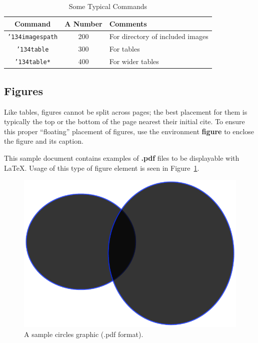 \documentclass[article]{stucosrec}
\begin{document}
	\begin{table}
		\centering
		\caption{Some Typical Commands}
		\label{tab:table2}
		\begin{tabular}{|c|c|l|} \hline
			Command&A Number&Comments\\ \hline
			\texttt{{\char'134}imagespath} & 200 & For directory of included images \\ \hline
			\texttt{{\char'134}table} & 300 & For tables\\ \hline
			\texttt{{\char'134}table*} & 400& For wider tables\\ \hline
		\end{tabular}
	\end{table}
	
	\subsection{Figures}
	
	Like tables, figures cannot be split across pages; the best placement for them is typically the top or the bottom of the page nearest their initial cite.
	To ensure this proper ``floating'' placement of figures, use the environment \textbf{figure} to enclose the figure and its caption.
	
	This sample document contains examples of \textbf{.pdf} files to be displayable with \LaTeX.
	Usage of this type of figure element is seen in Figure~\ref{fig:circles}.
	
	\begin{figure}
		\centering
		\includegraphics[scale=0.5]{circles.pdf}
		\caption{A sample circles graphic (.pdf format).}
		\label{fig:circles}
	\end{figure}
\end{document}
